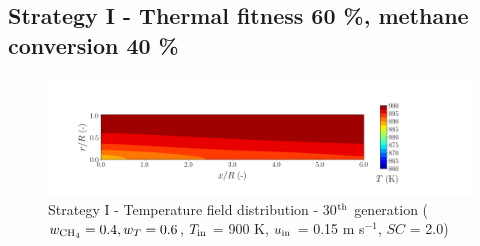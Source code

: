 \documentclass[preprint,12pt]{elsarticle}
\begin{document}



\clearpage



\subsection{Strategy I - Thermal fitness 60 \%, methane conversion 40 \%} 
\label{subsec:S14060}



%

\begin{figure}[h!]
\centering
\includegraphics[width=150mm]{results/5/40C_60T/GEN30-TFIELD.png}
\caption{\label{fig:5R4060G30-TField} Strategy I - Temperature field distribution - 30$^{\rm{th}}$ generation ($w_{\rm{CH_4}} = 0.4, w_T = 0.6$, $T_{\rm{in}}$ = 900 K, $u_{\rm{in}}$ = 0.15 m s$^{-1}$, $SC$ = 2.0)}
\end{figure}


%
\end{document}
